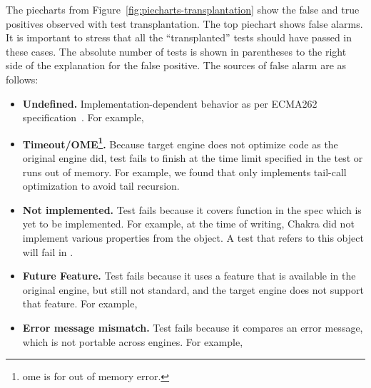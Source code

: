 \documentclass[10pt,conference,anonymous]{IEEEtran}
\begin{document}
The piecharts from Figure~\ref{fig:piecharts-transplantation} show the
false and true positives observed with test transplantation. The top
piechart shows false alarms.  It is important to stress that all the
``transplanted'' tests should have passed in these cases. The absolute
number of tests is shown in parentheses to the right side of the
explanation for the false positive. The sources of false alarm are as
follows:

\begin{itemize}
  \item \textbf{Undefined.} Implementation-dependent behavior as per
    ECMA262 specification~\cite{ecmas262-spec}. For example, 
  \item \textbf{Timeout/OME\footnote{ome is for out of memory
      error.}.} Because target engine does not optimize code as the
    original engine did, test fails to finish at the time limit
    specified in the test or runs out of memory. For example, we found
    that only \jsc{} implements tail-call optimization to avoid tail
    recursion.
  \item \textbf{Not implemented.} Test fails because it covers
    function in the spec which is yet to be implemented. For example,
    at the time of writing, Chakra did not implement various
    properties from the  object. A test that refers to
    this object will fail in \chakra{}.
  \item \textbf{Future Feature.} Test fails because it uses a feature
    that is available in the original engine, but still not standard,
    and the target engine does not support that feature. For example,
     
  \item \textbf{Error message mismatch.} Test fails because it
    compares an error message, which is not portable across
    engines. For example, 
\end{itemize}  
\end{document}
